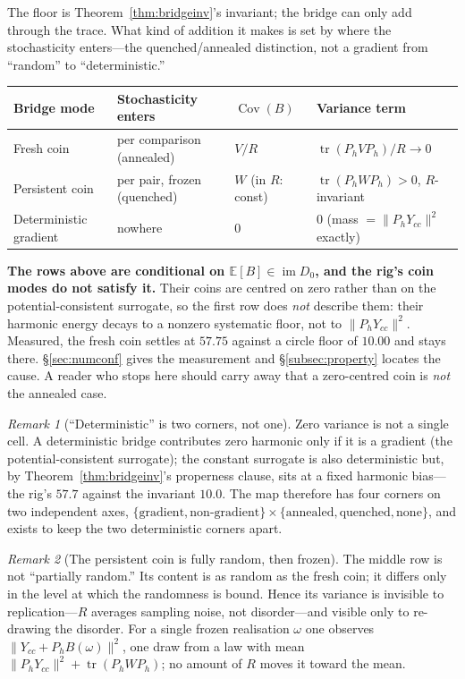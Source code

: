 \documentclass[11pt,a4paper]{article}
\theoremstyle{definition}
\theoremstyle{remark}
\newtheorem{remark}{Remark}
\newcommand{\im}{\operatorname{im}}
\newcommand{\Cov}{\operatorname{Cov}}
\newcommand{\tr}{\operatorname{tr}}
\newcommand{\Ph}{P_h}
\begin{document}
The floor is Theorem~\ref{thm:bridgeinv}'s invariant; the bridge can only add through the trace. What kind of addition it makes is set by where the stochasticity enters---the quenched/annealed distinction, not a gradient from ``random'' to ``deterministic.''

\begin{center}
\small
\begin{tabular}{@{}llll@{}}
\toprule
Bridge mode & Stochasticity enters & $\Cov(B)$ & Variance term \\
\midrule
Fresh coin & per comparison (annealed) & $V/R$ & $\tr(\Ph V\Ph)/R\to0$ \\
Persistent coin & per pair, frozen (quenched) & $W$ (in $R$: const) & $\tr(\Ph W\Ph)>0$, $R$-invariant \\
Deterministic gradient & nowhere & $0$ & $0$ (mass $=\|\Ph Y_{cc}\|^2$ exactly) \\
\bottomrule
\end{tabular}
\end{center}

\noindent
\textbf{The rows above are conditional on $\mathbb{E}[B]\in\im D_0$, and the rig's
coin modes do not satisfy it.} Their coins are centred on zero rather than on the
potential-consistent surrogate, so the first row does \emph{not} describe them:
their harmonic energy decays to a nonzero systematic floor, not to
$\|\Ph Y_{cc}\|^2$. Measured, the fresh coin settles at $57.75$ against a circle
floor of $10.00$ and stays there. \S\ref{sec:numconf} gives the measurement and
\S\ref{subsec:property} locates the cause. A reader who stops here should carry
away that a zero-centred coin is \emph{not} the annealed case.

\begin{remark}[``Deterministic'' is two corners, not one]\label{rem:twocorners}
Zero variance is not a single cell. A deterministic bridge contributes zero harmonic only if it is a gradient (the potential-consistent surrogate); the constant surrogate is also deterministic but, by Theorem~\ref{thm:bridgeinv}'s properness clause, sits at a fixed harmonic bias---the rig's $57.7$ against the invariant $10.0$. The map therefore has four corners on two independent axes, $\{\text{gradient},\text{non-gradient}\}\times\{\text{annealed},\text{quenched},\text{none}\}$, and \cite[\S3.2]{bradsher2026} exists to keep the two deterministic corners apart.
\end{remark}

\begin{remark}[The persistent coin is fully random, then frozen]\label{rem:frozencoin}
The middle row is not ``partially random.'' Its content is as random as the fresh coin; it differs only in the level at which the randomness is bound. Hence its variance is invisible to replication---$R$ averages sampling noise, not disorder---and visible only to re-drawing the disorder. For a single frozen realisation $\omega$ one observes $\|Y_{cc}+\Ph B(\omega)\|^2$, one draw from a law with mean $\|\Ph Y_{cc}\|^2+\tr(\Ph W\Ph)$; no amount of $R$ moves it toward the mean.
\end{remark}
\end{document}
